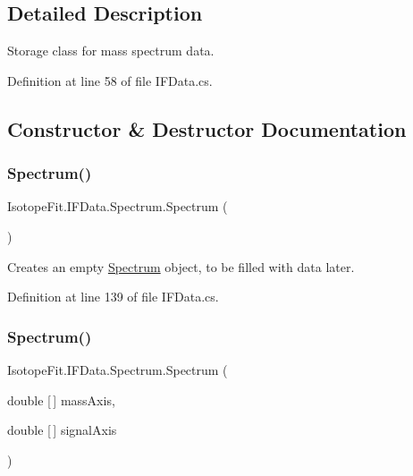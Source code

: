 \subsection{Detailed Description}
Storage class for mass spectrum data. 



Definition at line 58 of file I\+F\+Data.\+cs.



\subsection{Constructor \& Destructor Documentation}
\mbox{\label{class_isotope_fit_1_1_i_f_data_1_1_spectrum_a57f4b9355944433a34eb668f22bb1f17}} 
\subsubsection{\texorpdfstring{Spectrum()}{Spectrum()}\hspace{0.1cm}{\footnotesize\ttfamily [1/2]}}
{\footnotesize\ttfamily Isotope\+Fit.\+I\+F\+Data.\+Spectrum.\+Spectrum (\begin{DoxyParamCaption}{ }\end{DoxyParamCaption})}



Creates an empty \hyperlink{class_isotope_fit_1_1_i_f_data_1_1_spectrum}{Spectrum} object, to be filled with data later. 



Definition at line 139 of file I\+F\+Data.\+cs.

\mbox{\label{class_isotope_fit_1_1_i_f_data_1_1_spectrum_a0422d7cbabadc258d3dc6f1fd51f2e36}} 
\subsubsection{\texorpdfstring{Spectrum()}{Spectrum()}\hspace{0.1cm}{\footnotesize\ttfamily [2/2]}}
{\footnotesize\ttfamily Isotope\+Fit.\+I\+F\+Data.\+Spectrum.\+Spectrum (\begin{DoxyParamCaption}\item[{double \mbox{[}$\,$\mbox{]}}]{mass\+Axis,  }\item[{double \mbox{[}$\,$\mbox{]}}]{signal\+Axis }\end{DoxyParamCaption})}



